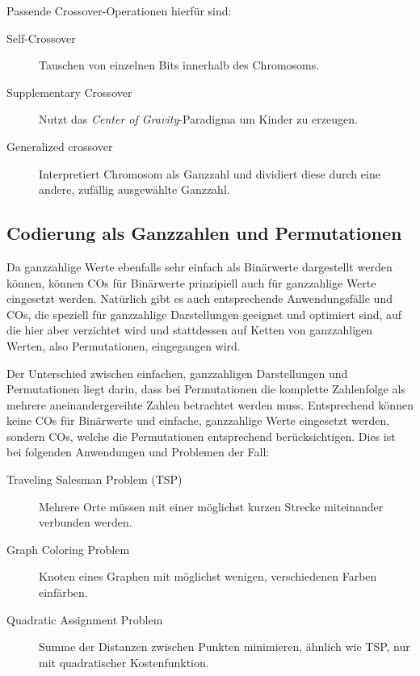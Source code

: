 	Passende Crossover-Operationen hierfür sind:
	\begin{description}
		\item[Self-Crossover] Tauschen von einzelnen Bits innerhalb des Chromosoms. \cite{SelfCrossover}
		\item[Supplementary Crossover] Nutzt das \textit{Center of Gravity}-Paradigma um Kin\-der zu erzeugen. \cite{SupplementaryCrossover}
		\item[Generalized crossover] Interpretiert Chromosom als Ganzzahl und dividiert diese durch eine andere, zufällig ausgewählte Ganzzahl. \cite{GeneralizedCrossover}
	\end{description}

\subsection{Codierung als Ganzzahlen und Permutationen}
\label{sec:IntCod}

	Da ganzzahlige Werte ebenfalls sehr einfach als Binärwerte dargestellt werden können, können COs für Binärwerte prinzipiell auch für ganzzahlige Werte eingesetzt werden. Natürlich gibt es auch entsprechende Anwendungsfälle und COs, die speziell für ganzzahlige Darstellungen geeignet und optimiert sind, auf die hier aber verzichtet wird und stattdessen auf Ketten von ganzzahligen Werten, also Permutationen, eingegangen wird.
	
	Der Unterschied zwischen einfachen, ganzzahligen Darstellungen und Permutationen liegt darin, dass bei Permutationen die komplette Zahlenfolge als mehrere aneinandergereihte Zahlen betrachtet werden muss. Entsprechend kön\-nen keine COs für Binärwerte und einfache, ganzzahlige Werte eingesetzt werden, sondern COs, welche die Permutationen entsprechend berücksichtigen. Dies ist \uA bei folgenden Anwendungen und Problemen der Fall:
	\begin{description}
		\item[Traveling Salesman Problem (TSP)] Mehrere Orte müssen mit einer mög\-lichst kurzen Strecke miteinander verbunden werden. \cite{GAforTSP}
		\item[Graph Coloring Problem] Knoten eines Graphen mit möglichst wenigen, verschiedenen Farben einfärben. \cite{OrderBasedForGCP}
		\item[Quadratic Assignment Problem] Summe der Distanzen zwischen Punkten minimieren, ähnlich wie TSP, nur mit quadratischer Kostenfunktion. \cite{COforQAP}
	\end{description}
	
